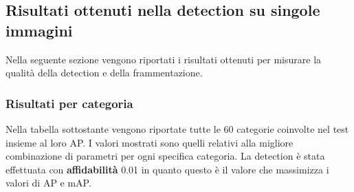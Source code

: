 \subsection{Risultati ottenuti nella detection su singole immagini}
Nella seguente sezione vengono riportati i risultati ottenuti per misurare la qualità della detection e della frammentazione.
\subsubsection{Risultati per categoria}
Nella tabella sottostante vengono riportate tutte le 60 categorie coinvolte nel test insieme al loro AP. I valori mostrati sono quelli relativi alla migliore combinazione di parametri per ogni specifica categoria. La detection è stata effettuata con \textbf{affidabilità} 0.01 in quanto questo è il valore che massimizza i valori di AP e mAP.
